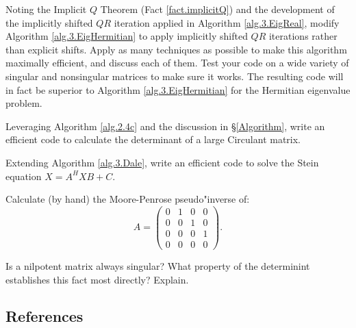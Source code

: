 \begin{exercise} \label{ex:04.impshiftherm} \rm Noting the Implicit $Q$ Theorem (Fact \ref{fact.implicitQ}) and the development of the implicitly shifted $QR$ iteration
applied in Algorithm \ref{alg.3.EigReal}, modify Algorithm \ref{alg.3.EigHermitian} to apply implicitly shifted $QR$ iterations rather than explicit shifts.  Apply as many
techniques as possible to make this algorithm maximally efficient, and discuss each of them.  Test your code on a wide variety of singular and nonsingular matrices
to make sure it works.  The resulting code will in fact be superior to Algorithm \ref{alg.3.EigHermitian} for the Hermitian eigenvalue problem.
\end{exercise}

\begin{exercise} \label{ex:04.det} \rm Leveraging Algorithm \ref{alg.2.4c} and the discussion in \S \ref{Algorithm},
write an efficient code to calculate the determinant of a large Circulant matrix.
\end{exercise}

\begin{exercise} \label{ex:04.stein} \rm Extending Algorithm \ref{alg.3.Dale}, write an efficient code to solve the Stein equation $X = A^H X B + C$.
\end{exercise}

\begin{exercise} \label{ex:04.pseudoinverse} \rm Calculate (by hand) the Moore-Penrose pseudo"inverse of:
\begin{equation*}
A=\begin{pmatrix} 0 & 1 & 0 & 0\\ 0 & 0 & 1 & 0\\ 0 & 0 & 0 & 1\\ 0 & 0 & 0 & 0 \end{pmatrix}.
\end{equation*}
\end{exercise}

\begin{exercise} \label{ex:04.nilpotent.singular} \rm Is a nilpotent matrix always singular?  What property of the determinint establishes this fact most
directly?  Explain.
\end{exercise}

\subsection*{References}\label{sec:04.References}

